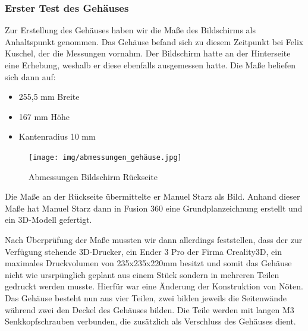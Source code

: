 \subsubsection{Erster Test des Gehäuses}
Zur Erstellung des Gehäuses haben wir die Maße des Bildschirms als Anhaltspunkt genommen. Das Gehäuse befand sich zu diesem Zeitpunkt bei Felix Kuschel, der die Messungen vornahm. Der Bildschirm hatte an der Hinterseite eine Erhebung, weshalb er diese ebenfalls ausgemessen hatte. Die Maße beliefen sich dann auf:
\begin{itemize}
	\item 255,5 mm Breite
	\item 167 mm Höhe
	\item Kantenradius 10 mm
\end{itemize}
	\begin{figure}[h!t]
		\texttt{[image: img/abmessungen\_gehäuse.jpg]}
		\caption[Abmessungen Bildschirm Rückseite]{Abmessungen Bildschirm Rückseite}
		\label{fig:screen-back-01}
	\end{figure}
	Die Maße an der Rückseite übermittelte er Manuel Starz als Bild. Anhand dieser Maße hat Manuel Starz dann in Fusion 360 eine Grundplanzeichnung erstellt und ein 3D-Modell gefertigt.\par	
	Nach Überprüfung der Maße mussten wir dann allerdings feststellen, dass der zur Verfügung stehende 3D-Drucker, ein Ender 3 Pro der Firma Creality3D, ein maximales Druckvolumen von 235x235x220mm besitzt und somit das Gehäuse nicht wie ursrpünglich geplant aus einem Stück sondern in mehreren Teilen gedruckt werden musste. Hierfür war eine Änderung der Konstruktion von Nöten. Das Gehäuse besteht nun aus vier Teilen, zwei bilden jeweils die Seitenwände während zwei den Deckel des Gehäuses bilden. Die Teile werden mit langen M3 Senkkopfschrauben verbunden, die zusätzlich als Verschluss des Gehäuses dient. \par
	
